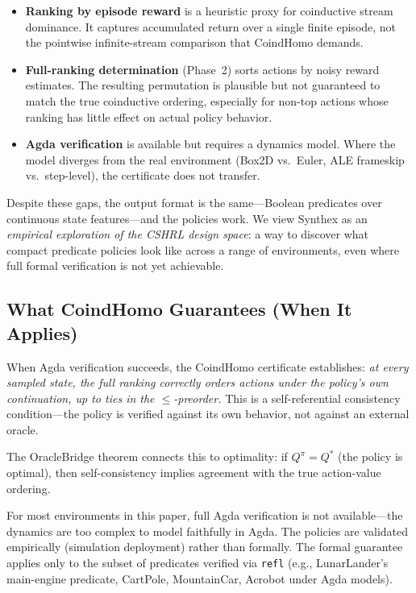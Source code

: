 \documentclass[9pt,a4paper]{article}
\theoremstyle{plain}
\theoremstyle{definition}
\theoremstyle{remark}
\begin{document}
\begin{itemize}
\item \textbf{Ranking by episode reward} is a heuristic proxy for
      coinductive stream dominance.  It captures accumulated
      return over a single finite episode, not the pointwise
      infinite-stream comparison that CoindHomo demands.

\item \textbf{Full-ranking determination} (Phase~2) sorts actions
      by noisy reward estimates.  The resulting permutation is
      plausible but not guaranteed to match the true coinductive
      ordering, especially for non-top actions whose ranking has
      little effect on actual policy behavior.

\item \textbf{Agda verification} is available but requires a
      dynamics model.  Where the model diverges from the real
      environment (Box2D vs.\ Euler, ALE frameskip vs.\ step-level),
      the certificate does not transfer.
\end{itemize}

Despite these gaps, the output format is the same---Boolean
predicates over continuous state features---and the policies work.
We view Synthex as an \emph{empirical exploration of the CSHRL
design space}: a way to discover what compact predicate policies
look like across a range of environments, even where full formal
verification is not yet achievable.

\subsection{What CoindHomo Guarantees (When It Applies)}

When Agda verification succeeds, the CoindHomo certificate
establishes: \emph{at every sampled state, the full ranking
correctly orders actions under the policy's own continuation,
up to ties in the $\le$-preorder.}  This is a self-referential
consistency condition---the policy is verified against its own
behavior, not against an external oracle.

The OracleBridge theorem connects this to optimality: if
$Q^\pi = Q^*$ (the policy is optimal), then self-consistency
implies agreement with the true action-value ordering.

For most environments in this paper, full Agda verification is
not available---the dynamics are too complex to model faithfully
in Agda.  The policies are validated empirically
(simulation deployment) rather than formally.  The formal guarantee
applies only to the subset of predicates verified via
\texttt{refl} (e.g., LunarLander's main-engine predicate,
CartPole, MountainCar, Acrobot under Agda models).
\end{document}
